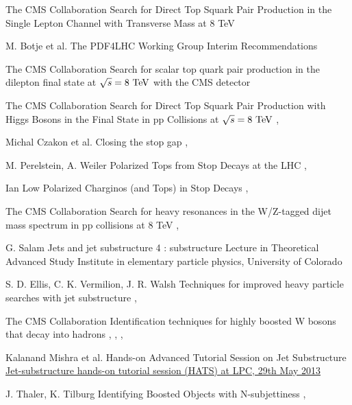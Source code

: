 
{The CMS Collaboration}
{Search for Direct Top Squark Pair Production in the Single Lepton Channel
with Transverse Mass at 8 TeV}
{}

{M. Botje et al.}
{The PDF4LHC Working Group Interim Recommendations}
{}


{The CMS Collaboration}
{Search for scalar top quark pair production in the dilepton
final state at $\sqrt{s} = 8~\text{TeV}$ with the CMS detector}
{}

{The CMS Collaboration}
{Search for Direct Top Squark Pair Production with Higgs Bosons in the Final
State in pp Collisions at $\sqrt{s} = 8~\text{TeV}$}
{, }

{Michal Czakon et al.}
{Closing the stop gap}
{, }

{M. Perelstein, A. Weiler}
{Polarized Tops from Stop Decays at the LHC}
{, }

{Ian Low}
{Polarized Charginos (and Tops) in Stop Decays}
{, }


{The CMS Collaboration}
{Search for heavy resonances in the W/Z-tagged dijet mass
spectrum in pp collisions at 8 TeV}
{, }

{G. Salam}
{Jets and jet substructure 4 : substructure}
{Lecture in Theoretical Advanced Study Institute in elementary particle physics,
University of Colorado}

{S. D. Ellis, C. K. Vermilion, J. R. Walsh}
{Techniques for improved heavy particle searches with jet substructure}
{, }

{The CMS Collaboration}
{Identification techniques for highly boosted W bosons that decay into hadrons}
{, , , }

{Kalanand Mishra et al.}
{Hands-on Advanced Tutorial Session on Jet Substructure}
{\href{https://twiki.cern.ch/twiki/pub/CMSPublic/SWGuideHATSJetSubstructure/JS_HATS_intro.pdf}{Jet-substructure hands-on tutorial session (HATS) at LPC, 29th May 2013}}

{J. Thaler, K. Tilburg}
{Identifying Boosted Objects with N-subjettiness}
{, }



